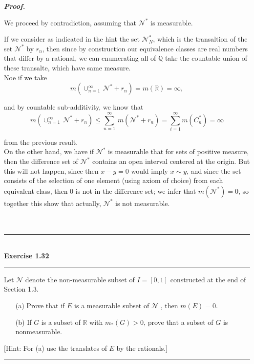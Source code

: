 \documentclass[a4paper,11pt]{article}
\begin{document}
\textbf{\textit{Proof.}}

We proceed by contradiction, assuming that $\mathcal{N}^*$ is measurable.

If we consider as indicated in the hint the set $\mathcal{N}_N^*$, which is the transaltion of the set $\mathcal{N}^*$ by $r_n$, then since by construction our equivalence classes are real numbers that differ by a rational, we can enumerating all of $\mathbb{Q}$ take the countable union of these transalte, which have same measure.\\

Noe if we take
	$$m\left( \cup_{n=1}^{\infty}\, \mathcal{N}^* + r_n \right)
	= m(\mathbb{R})
	= \infty,$$

and by countable sub-additivity, we know that
	$$m\left( \cup_{n=1}^{\infty}\, \mathcal{N}^* + r_n \right)
	\leq \sum_{n=1}^\infty\,m(\mathcal{N}^* + r_n)
	= \sum_{i=1}^\infty m(C_n^*)
	= \infty$$

from the previous result.\\

On the other hand, we have if $\mathcal{N}^*$ is measurable that for sets of positive measure, then the difference set of $\mathcal{N}^*$ contains an open interval centered at the origin. But this will not happen, since then $x - y = 0$ would imply $x \sim y$, and since the set consists of the selection of one element (using axiom of choice) from each equivalent class, then $0$ is not in the difference set; we infer that $m(\mathcal{N}^*) = 0$, so together this show that actually, $\mathcal{N}^*$ is not measurable.\\\\\\



\begin{flushleft}
	\rule[-0.5ex]{17cm}{2pt}\\
		\textbf{Exercise 1.32}\\
	\rule[1.5ex]{17cm}{0.5pt}
		Let $\mathcal{N}$ denote the non-measurable subset of $I = [0, 1]$ constructed at the end of Section 1.3.
		\begin{enumerate}
			\item [(a)] Prove that if $E$ is a measurable subset of $\mathcal{N}$ , then $m(E) = 0$.

			\item [(b)] If $G$ is a subset of $\mathbb{R}$ with $m_*(G) > 0$, prove that a subset of $G$ is nonmeasurable.
		\end{enumerate}
		$[$Hint: For (a) use the translates of $E$ by the rationals.$]$
	\rule[1.0ex]{17cm}{0.5pt}\
\end{flushleft}
\end{document}

